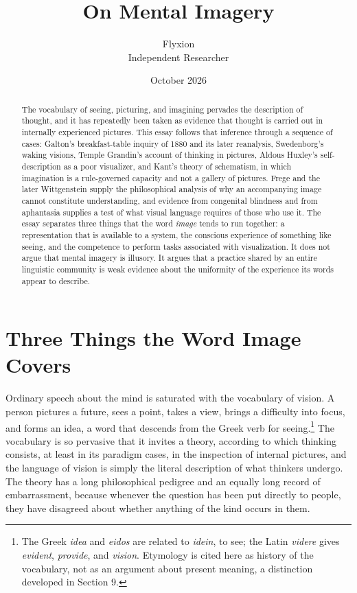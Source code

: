 \documentclass[11pt]{article}
\title{On Mental Imagery}
\author{Flyxion\\Independent Researcher}
\date{October 2026}
\theoremstyle{remark}
\begin{document}
\maketitle

\begin{abstract}
The vocabulary of seeing, picturing, and imagining pervades the description of thought, and it has repeatedly been taken as evidence that thought is carried out in internally experienced pictures. This essay follows that inference through a sequence of cases: Galton's breakfast-table inquiry of 1880 and its later reanalysis, Swedenborg's waking visions, Temple Grandin's account of thinking in pictures, Aldous Huxley's self-description as a poor visualizer, and Kant's theory of schematism, in which imagination is a rule-governed capacity and not a gallery of pictures. Frege and the later Wittgenstein supply the philosophical analysis of why an accompanying image cannot constitute understanding, and evidence from congenital blindness and from aphantasia supplies a test of what visual language requires of those who use it. The essay separates three things that the word \emph{image} tends to run together: a representation that is available to a system, the conscious experience of something like seeing, and the competence to perform tasks associated with visualization. It does not argue that mental imagery is illusory. It argues that a practice shared by an entire linguistic community is weak evidence about the uniformity of the experience its words appear to describe.
\end{abstract}

\section{Three Things the Word Image Covers}

Ordinary speech about the mind is saturated with the vocabulary of vision. A person pictures a future, sees a point, takes a view, brings a difficulty into focus, and forms an idea, a word that descends from the Greek verb for seeing.\footnote{The Greek \emph{idea} and \emph{eidos} are related to \emph{idein}, to see; the Latin \emph{videre} gives \emph{evident}, \emph{provide}, and \emph{vision}. Etymology is cited here as history of the vocabulary, not as an argument about present meaning, a distinction developed in Section 9.} The vocabulary is so pervasive that it invites a theory, according to which thinking consists, at least in its paradigm cases, in the inspection of internal pictures, and the language of vision is simply the literal description of what thinkers undergo. The theory has a long philosophical pedigree and an equally long record of embarrassment, because whenever the question has been put directly to people, they have disagreed about whether anything of the kind occurs in them.
\end{document}
